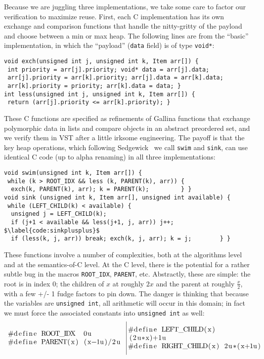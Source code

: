 Because we are juggling three implementations, we take some care to factor our verification to maximize reuse.  First, each C implementation has its own exchange and comparison functions that handle the nitty-gritty of the payload and choose between a min or max heap.  The following lines are from the ``basic'' implementation, in which the ``payload'' (\texttt{data} field) is of type \texttt{void*}:
\begin{lstlisting}
void exch(unsigned int j, unsigned int k, Item arr[]) {
 int priority = arr[j].priority; void* data = arr[j].data;
 arr[j].priority = arr[k].priority; arr[j].data = arr[k].data;
 arr[k].priority = priority; arr[k].data = data; }
int less(unsigned int j, unsigned int k, Item arr[]) {
 return (arr[j].priority <= arr[k].priority); }
\end{lstlisting}
These C functions are specified as refinements of Gallina functions that exchange polymorphic data in lists and compare objects in an abstract preordered set, and we verify them in VST after a little irksome engineering.  The payoff is that the key heap operations, which following Sedgewick~\cite{Sedgewick} we call \texttt{swim} and \texttt{sink}, can use identical C code (up to alpha renaming) in all three implementations:
\begin{lstlisting}
void swim(unsigned int k, Item arr[]) {
 while (k > ROOT_IDX && less (k, PARENT(k), arr)) {
  exch(k, PARENT(k), arr); k = PARENT(k);         } }
void sink (unsigned int k, Item arr[], unsigned int available) {
 while (LEFT_CHILD(k) < available) {
  unsigned j = LEFT_CHILD(k);
  if (j+1 < available && less(j+1, j, arr)) j++; $\label{code:sinkplusplus}$
  if (less(k, j, arr)) break; exch(k, j, arr); k = j;        } }
\end{lstlisting}
These functions involve a number of complexities, both at the algorithms level and at the semantics-of-C level.  At the C level, there is the potential for a rather subtle bug in the macros \texttt{ROOT\_IDX}, \texttt{PARENT}, etc.  Abstractly, these are simple: the root is in index 0; the children of $x$ at roughly $2x$ and the parent at roughly $\frac{x}{2}$, with a few +/- 1 fudge factors to pin down.  The danger is thinking that because the variables are \texttt{unsigned int}, all arithmetic will occur in this domain; in fact we must force the associated constants into \texttt{unsigned int} as well:
\[
\begin{array}{@{}l@{~~}|@{~}l@{}}
\begin{minipage}{0.475\textwidth}
\begin{lstlisting}
#define ROOT_IDX  0u
#define PARENT(x) (x-1u)/2u
\end{lstlisting} \end{minipage} &
\begin{minipage}{0.5\textwidth}
\begin{lstlisting}
#define LEFT_CHILD(x)  (2u*x)+1u
#define RIGHT_CHILD(x) 2u*(x+1u)
\end{lstlisting}
\end{minipage}
\end{array}
\]
